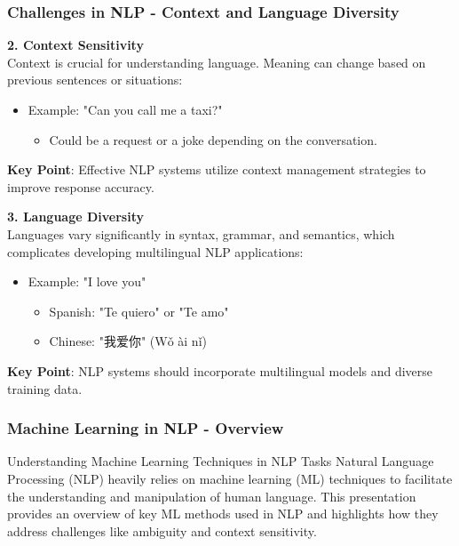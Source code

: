 \documentclass[aspectratio=169]{beamer}
\begin{document}
\begin{frame}[fragile]
    \frametitle{Challenges in NLP - Context and Language Diversity}
    
    \textbf{2. Context Sensitivity} \\
    Context is crucial for understanding language. Meaning can change based on previous sentences or situations:
    \begin{itemize}
        \item Example: "Can you call me a taxi?" 
        \begin{itemize}
            \item Could be a request or a joke depending on the conversation.
        \end{itemize}
    \end{itemize}
    
    \textbf{Key Point}: Effective NLP systems utilize context management strategies to improve response accuracy.
    
    \vspace{1em}
    
    \textbf{3. Language Diversity} \\
    Languages vary significantly in syntax, grammar, and semantics, which complicates developing multilingual NLP applications:
    \begin{itemize}
        \item Example: "I love you"
        \begin{itemize}
            \item Spanish: "Te quiero" or "Te amo"
            \item Chinese: "我爱你" (Wǒ ài nǐ)
        \end{itemize}
    \end{itemize}
    
    \textbf{Key Point}: NLP systems should incorporate multilingual models and diverse training data.
\end{frame}

\begin{frame}[fragile]
    \frametitle{Machine Learning in NLP - Overview}
    \begin{block}{Understanding Machine Learning Techniques in NLP Tasks}
        Natural Language Processing (NLP) heavily relies on machine learning (ML) techniques to facilitate the understanding and manipulation of human language. This presentation provides an overview of key ML methods used in NLP and highlights how they address challenges like ambiguity and context sensitivity.
    \end{block}
\end{frame}
\end{document}
